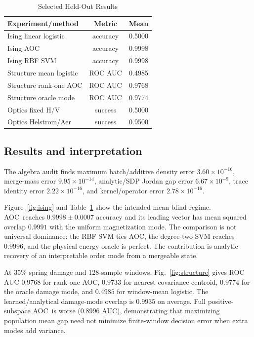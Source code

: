 \documentclass[letterpaper,journal]{IEEEtran}
\newcommand{\AOC}{\textsc{AOC}}
\begin{document}
\begin{table}[t]
\caption{Selected Held-Out Results}
\label{tab:results}
\centering
\small
\begin{tabular}{lcc}
\toprule
Experiment/method & Metric & Mean\\
\midrule
Ising linear logistic & accuracy & 0.5000\\
Ising \AOC & accuracy & 0.9998\\
Ising RBF SVM & accuracy & 0.9998\\
Structure mean logistic & ROC AUC & 0.4985\\
Structure rank-one \AOC & ROC AUC & 0.9768\\
Structure oracle mode & ROC AUC & 0.9774\\
Optics fixed H/V & success & 0.5000\\
Optics Helstrom/Aer & success & 0.9500\\
\bottomrule
\end{tabular}
\end{table}

\subsection{Results and interpretation}

The algebra audit finds maximum batch/additive density error
$3.60\times10^{-16}$, merge-mass error $9.95\times10^{-14}$, analytic/SDP
Jordan gap error $6.67\times10^{-9}$, trace identity error
$2.22\times10^{-16}$, and kernel/operator error $2.78\times10^{-16}$.

Figure~\ref{fig:ising} and Table~\ref{tab:results} show the intended
mean-blind regime. \AOC\ reaches $0.9998\pm0.0007$ accuracy and its leading
vector has mean squared overlap $0.9991$ with the uniform magnetization mode.
The comparison is not universal dominance: the RBF SVM ties \AOC, the
degree-two SVM reaches $0.9996$, and the physical energy oracle is perfect.
The contribution is analytic recovery of an interpretable order mode from a
mergeable state.

At $35\%$ spring damage and 128-sample windows, Fig.~\ref{fig:structure} gives
ROC AUC $0.9768$ for rank-one \AOC, $0.9733$ for nearest covariance centroid,
$0.9774$ for the oracle damage mode, and $0.4985$ for window-mean logistic.
The learned/analytical damage-mode overlap is $0.9935$ on average. Full
positive-subspace \AOC\ is worse ($0.8996$ AUC), demonstrating that maximizing
population mean gap need not minimize finite-window decision error when extra
modes add variance.
\end{document}
